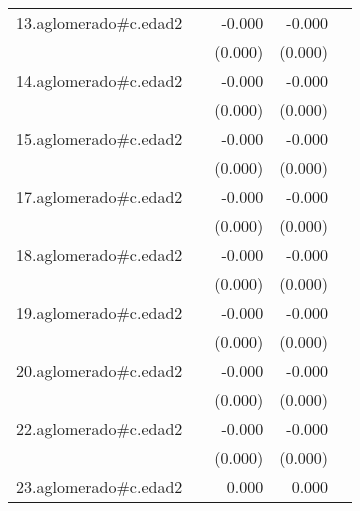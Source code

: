 {\begin{longtable}{l*{4}{D{.}{.}{-1}}}
\addlinespace
13.aglomerado#c.edad2&                     &      -0.000         &      -0.000         &                     \\
            &                     &     (0.000)         &     (0.000)         &                     \\
\addlinespace
14.aglomerado#c.edad2&                     &      -0.000         &      -0.000\sym{*}  &                     \\
            &                     &     (0.000)         &     (0.000)         &                     \\
\addlinespace
15.aglomerado#c.edad2&                     &      -0.000         &      -0.000         &                     \\
            &                     &     (0.000)         &     (0.000)         &                     \\
\addlinespace
17.aglomerado#c.edad2&                     &      -0.000         &      -0.000         &                     \\
            &                     &     (0.000)         &     (0.000)         &                     \\
\addlinespace
18.aglomerado#c.edad2&                     &      -0.000         &      -0.000         &                     \\
            &                     &     (0.000)         &     (0.000)         &                     \\
\addlinespace
19.aglomerado#c.edad2&                     &      -0.000         &      -0.000         &                     \\
            &                     &     (0.000)         &     (0.000)         &                     \\
\addlinespace
20.aglomerado#c.edad2&                     &      -0.000         &      -0.000         &                     \\
            &                     &     (0.000)         &     (0.000)         &                     \\
\addlinespace
22.aglomerado#c.edad2&                     &      -0.000         &      -0.000         &                     \\
            &                     &     (0.000)         &     (0.000)         &                     \\
\addlinespace
23.aglomerado#c.edad2&                     &       0.000         &       0.000         &                     \\

\end{longtable}}
